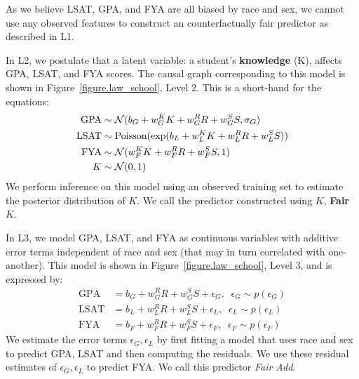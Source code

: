 As we believe LSAT, GPA, and FYA are all biased by race and sex, we
cannot use any observed features to construct an counterfactually fair
predictor as described in L1. %

In L2, we postulate that a latent variable: a student's \textbf{knowledge} (K), affects GPA, LSAT, and FYA scores. The causal graph corresponding to this model is shown in Figure~\ref{figure.law_school}, Level 2. This is a short-hand for the equations:
\begin{align}
\mbox{GPA} &\sim {\cal N}(b_{G} + w_{G}^K K + w_{G}^R R + w_{G}^S S, \sigma_{G}) \nonumber \\
\mbox{LSAT} &\sim \textrm{Poisson}(\exp(b_{L} + w_{L}^K K + w_{L}^R R + w_{L}^S S)) \nonumber \\
\mbox{FYA} &\sim {\cal N}(w_{F}^K K + w_{F}^R R + w_{F}^S S, 1) \nonumber \\
K &\sim {\cal N}(0,1) \nonumber
\end{align}
We perform inference on this model using an observed training set to estimate the posterior distribution of $K$. We call the predictor constructed using $K$, \textbf{Fair $K$}.

In L3, we model GPA, LSAT, and FYA as continuous variables with additive error terms independent of race and sex (that may in turn correlated with one-another). This model is shown in Figure~\ref{figure.law_school}, Level 3, and is expressed by: %
\begin{align}
\mbox{GPA} &= b_{G} + w_{G}^R R + w_{G}^S S + \epsilon_G, \;\; \epsilon_G \sim p(\epsilon_G) \nonumber \\
\mbox{LSAT} &= b_{L} + w_{L}^R R + w_{L}^S S + \epsilon_L, \;\; \epsilon_L \sim p(\epsilon_L) \nonumber \\
\mbox{FYA} &= b_{F} + w_{F}^R R + w_{F}^S S + \epsilon_F, \;\; \epsilon_F \sim p(\epsilon_F) \nonumber
\end{align}
We estimate the error terms $\epsilon_G,\epsilon_L$ by first fitting a model that uses race and sex to predict GPA, LSAT and then computing the residuals. We use these residual estimates of $\epsilon_G,\epsilon_L$ to predict FYA. We call this predictor \emph{Fair Add}.




